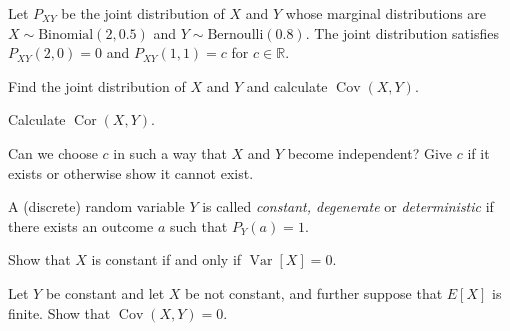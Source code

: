 \documentclass[a4paper,10pt,landscape,twocolumn]{scrartcl}
\DeclareMathOperator{\Cov}{Cov}
\DeclareMathOperator{\Cor}{Cor}
\DeclareMathOperator{\Var}{Var}
\begin{document}
\begin{exercise}[3pt]
  Let $P_{XY}$ be the joint distribution of $X$ and $Y$ whose marginal
  distributions are $X \sim \text{Binomial}(2, 0.5)$ and 
  $Y \sim \text{Bernoulli}(0.8)$. The joint distribution satisfies 
  $P_{XY}(2,0) = 0$ and $P_{XY}(1,1) = c$ for $c\in \mathbb R$.

  \begin{subex}[1pt]
    Find the joint distribution of $X$ and $Y$ and calculate $\Cov(X,Y)$.
  \end{subex}
  
  \begin{subex}[1pt]
  Calculate $\Cor(X,Y)$.	
  \end{subex}
  
  \begin{subex}[1pt]
    Can we choose $c$ in such a way that $X$ and $Y$ become independent? Give
    $c$ if it exists or otherwise show it cannot exist.
  \end{subex}
\end{exercise}


\begin{exercise}
  A (discrete) random variable $Y$ is called \emph{constant, degenerate} or
  \emph{deterministic} if there exists an outcome $a$ such that $P_Y(a) = 1$.

  \begin{subex}[1pt]
    Show that $X$ is constant if and only if $\Var[X] = 0$.	
  \end{subex}
  
  \begin{subex}[1pt]
    Let $Y$ be constant and let $X$ be not constant, and further suppose that
    $E[X]$ is finite. Show that $\Cov(X,Y) = 0$.
  \end{subex}
\end{exercise}
\end{document}
